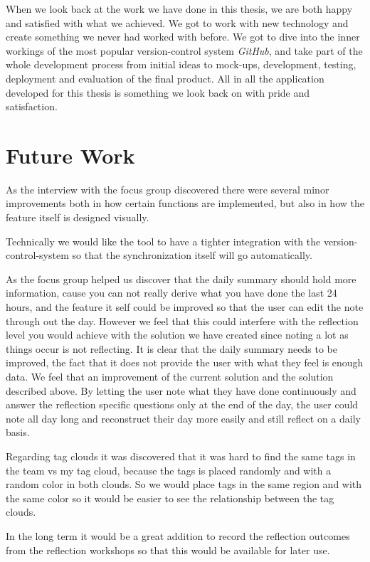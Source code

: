 When we look back at the work we have done in this thesis, we are both happy and satisfied with what we achieved. We got to work with new technology and create something we never had worked with before. We got to dive into the inner workings of the most popular version-control system \emph{GitHub}, and take part of the whole development process from initial ideas to mock-ups, development, testing, deployment and evaluation of the final product. All in all the application developed for this thesis is something we look back on with pride and satisfaction. 

\section{Future Work}
\label{sec:futurework}
As the interview with the focus group discovered there were several minor improvements both in how certain functions are implemented, but also in how the feature itself is designed visually. 

Technically we would like the tool to have a tighter integration with the version-control-system so that the synchronization itself will go automatically.

As the focus group helped us discover that the daily summary should hold more information, cause you can not really derive what you have done the last 24 hours, and the feature it self could be improved so that the user can edit the note through out the day. However we feel that this could interfere with the reflection level you would achieve with the solution we have created since noting a lot as things occur is not reflecting. It is clear that the daily summary needs to be improved, the fact that it does not provide the user with what they feel is enough data. We feel that an improvement of the current solution and the solution described above. By letting the user note what they have done continuously and answer the reflection specific questions only at the end of the day, the user could note all day long and reconstruct their day more easily and still reflect on a daily basis.

Regarding tag clouds it was discovered that it was hard to find the same tags in the team vs my tag cloud, because the tags is placed randomly and with a random color in both clouds. So we would place tags in the same region and with the same color so it would be  easier to see the relationship between the tag clouds.

In the long term it would be a great addition to record the reflection outcomes from the reflection workshops so that this would be available for later use. 
